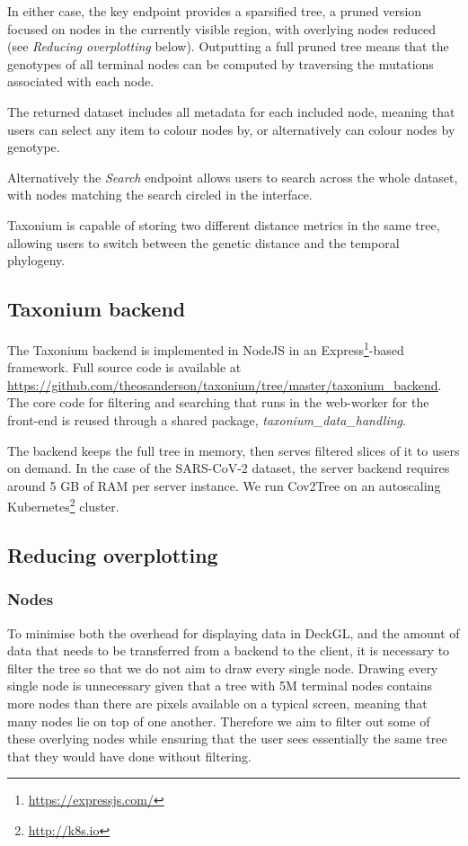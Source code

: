 \documentclass[twocolumn]{bioRxiv}
\begin{document}
In either case, the key endpoint provides a sparsified tree, a pruned version focused on nodes in the currently visible region, with overlying nodes reduced (see \textit{Reducing overplotting} below). Outputting a full pruned tree means that the genotypes of all terminal nodes can be computed by traversing the mutations associated with each node.

The returned dataset includes all metadata for each included node, meaning that users can select any item to colour nodes by, or alternatively can colour nodes by genotype.

Alternatively the \emph{Search} endpoint allows users to search across the whole dataset, with nodes matching the search circled in the interface.

Taxonium is capable of storing two different distance metrics in the same tree, allowing users to switch between the genetic distance and the temporal phylogeny. 




\subsection*{Taxonium backend}
The Taxonium backend is implemented in NodeJS in an Express\footnote{\url{https://expressjs.com/}}-based framework. Full source code is available at \url{https://github.com/theosanderson/taxonium/tree/master/taxonium_backend}. The core code for filtering and searching that runs in the web-worker for the front-end is reused through a shared package, \emph{taxonium\_data\_handling}.

The backend keeps the full tree in memory, then serves filtered slices of it to users on demand. In the case of the SARS-CoV-2 dataset, the server backend requires around 5 GB of RAM per server instance. We run Cov2Tree on an autoscaling Kubernetes\footnote{\url{http://k8s.io}} cluster.


\subsection*{Reducing overplotting}
\subsubsection*{Nodes}

To minimise both the overhead for displaying data in DeckGL, and the amount of data that needs to be transferred from a backend to the client, it is necessary to filter the tree so that we do not aim to draw every single node. Drawing every single node is unnecessary given that a tree with 5M terminal nodes contains more nodes than there are pixels available on a typical screen, meaning that many nodes lie on top of one another. Therefore we aim to filter out some of these overlying nodes while ensuring that the user sees essentially the same tree that they would have done without filtering.
\end{document}
